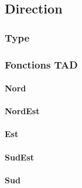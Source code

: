 
\subsection{Direction}
  \subsubsection{Type}

  \subsubsection{Fonctions TAD}
    \paragraph{Nord}
      \begin{algorithme}
        {
        }
      \end{algorithme}

    \paragraph{NordEst}
      \begin{algorithme}
        {
        }
      \end{algorithme}

    \paragraph{Est}
      \begin{algorithme}
        {
        }
      \end{algorithme}

    \paragraph{SudEst}
      \begin{algorithme}
        {
        }
      \end{algorithme}

    \paragraph{Sud}
      \begin{algorithme}
        {
        }
      \end{algorithme}

